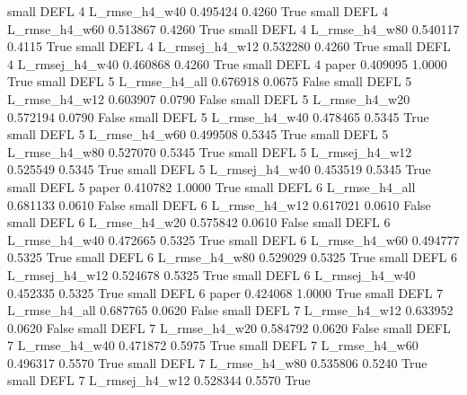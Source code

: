      small     DEFL                 4  L_rmse_h4_w40   0.495424      0.4260    True
     small     DEFL                 4  L_rmse_h4_w60   0.513867      0.4260    True
     small     DEFL                 4  L_rmse_h4_w80   0.540117      0.4115    True
     small     DEFL                 4 L_rmsej_h4_w12   0.532280      0.4260    True
     small     DEFL                 4 L_rmsej_h4_w40   0.460868      0.4260    True
     small     DEFL                 4          paper   0.409095      1.0000    True
     small     DEFL                 5  L_rmse_h4_all   0.676918      0.0675   False
     small     DEFL                 5  L_rmse_h4_w12   0.603907      0.0790   False
     small     DEFL                 5  L_rmse_h4_w20   0.572194      0.0790   False
     small     DEFL                 5  L_rmse_h4_w40   0.478465      0.5345    True
     small     DEFL                 5  L_rmse_h4_w60   0.499508      0.5345    True
     small     DEFL                 5  L_rmse_h4_w80   0.527070      0.5345    True
     small     DEFL                 5 L_rmsej_h4_w12   0.525549      0.5345    True
     small     DEFL                 5 L_rmsej_h4_w40   0.453519      0.5345    True
     small     DEFL                 5          paper   0.410782      1.0000    True
     small     DEFL                 6  L_rmse_h4_all   0.681133      0.0610   False
     small     DEFL                 6  L_rmse_h4_w12   0.617021      0.0610   False
     small     DEFL                 6  L_rmse_h4_w20   0.575842      0.0610   False
     small     DEFL                 6  L_rmse_h4_w40   0.472665      0.5325    True
     small     DEFL                 6  L_rmse_h4_w60   0.494777      0.5325    True
     small     DEFL                 6  L_rmse_h4_w80   0.529029      0.5325    True
     small     DEFL                 6 L_rmsej_h4_w12   0.524678      0.5325    True
     small     DEFL                 6 L_rmsej_h4_w40   0.452335      0.5325    True
     small     DEFL                 6          paper   0.424068      1.0000    True
     small     DEFL                 7  L_rmse_h4_all   0.687765      0.0620   False
     small     DEFL                 7  L_rmse_h4_w12   0.633952      0.0620   False
     small     DEFL                 7  L_rmse_h4_w20   0.584792      0.0620   False
     small     DEFL                 7  L_rmse_h4_w40   0.471872      0.5975    True
     small     DEFL                 7  L_rmse_h4_w60   0.496317      0.5570    True
     small     DEFL                 7  L_rmse_h4_w80   0.535806      0.5240    True
     small     DEFL                 7 L_rmsej_h4_w12   0.528344      0.5570    True
